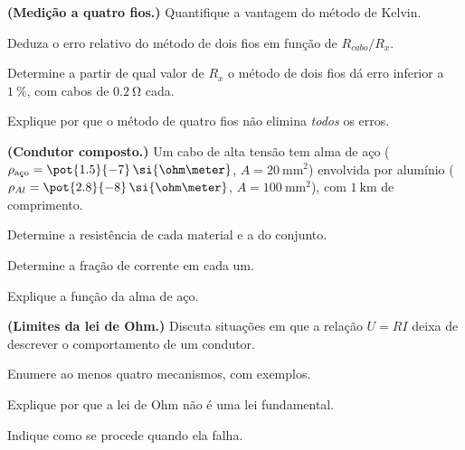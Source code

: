 \begin{questao}[4]{}

\textbf{(Medição a quatro fios.)} Quantifique a vantagem do método de Kelvin.
\begin{itensq}
\item Deduza o erro relativo do método de dois fios em função de
      $R_{cabo}/R_x$.
\item Determine a partir de qual valor de $R_x$ o método de dois fios dá erro
      inferior a $\SI{1}{\percent}$, com cabos de $\SI{0.2}{\ohm}$ cada.
\item Explique por que o método de quatro fios não elimina \emph{todos} os
      erros.
\end{itensq}


\end{questao}
\begin{questao}[4]{}

\textbf{(Condutor composto.)} Um cabo de alta tensão tem alma de aço
($\rho_{\text{aço}}=\pot{1.5}{-7}\,\si{\ohm\meter}$, $A=\SI{20}{\milli\meter\squared}$)
envolvida por alumínio ($\rho_{Al}=\pot{2.8}{-8}\,\si{\ohm\meter}$,
$A=\SI{100}{\milli\meter\squared}$), com $\SI{1}{\kilo\meter}$ de comprimento.
\begin{itensq}
\item Determine a resistência de cada material e a do conjunto.
\item Determine a fração de corrente em cada um.
\item Explique a função da alma de aço.
\end{itensq}


\end{questao}
\begin{questao}[4]{}

\textbf{(Limites da lei de Ohm.)} Discuta situações em que a relação
$U=RI$ deixa de descrever o comportamento de um condutor.
\begin{itensq}
\item Enumere ao menos quatro mecanismos, com exemplos.
\item Explique por que a lei de Ohm não é uma lei fundamental.
\item Indique como se procede quando ela falha.
\end{itensq}


\end{questao}

